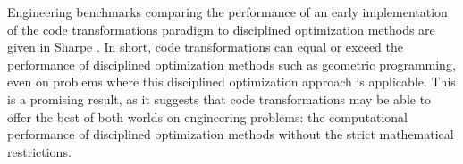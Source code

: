 Engineering benchmarks comparing the performance of an early implementation of the code transformations paradigm to disciplined optimization methods are given in Sharpe \cite{sharpe_aerosandbox_2021}. In short, code transformations can equal or exceed the performance of disciplined optimization methods such as geometric programming, even on problems where this disciplined optimization approach is applicable. This is a promising result, as it suggests that code transformations may be able to offer the best of both worlds on engineering problems: the computational performance of disciplined optimization methods without the strict mathematical restrictions.
